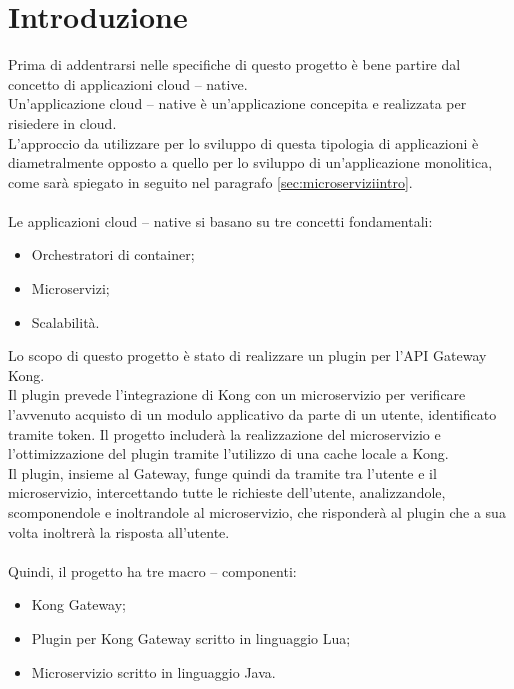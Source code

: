 \chapter*{Introduzione} %

Prima di addentrarsi nelle specifiche di questo progetto è bene partire dal concetto di applicazioni cloud – native.\\
Un'applicazione cloud – native è un'applicazione concepita e realizzata per risiedere in cloud.\\
L'approccio da utilizzare per lo sviluppo di questa tipologia di applicazioni è diametralmente opposto a quello per lo sviluppo di un'applicazione monolitica, 
come sarà spiegato in seguito nel paragrafo \ref{sec:microserviziintro}.\\ \\
Le applicazioni cloud – native si basano su tre concetti fondamentali:
\begin{itemize}
\item Orchestratori di container;
\item Microservizi;
\item Scalabilità.
\end{itemize}

Lo scopo di questo progetto è stato di realizzare un plugin per l'API Gateway Kong.\\
Il plugin prevede l'integrazione di Kong con un microservizio per verificare l'avvenuto acquisto di un modulo applicativo da parte di un utente, identificato tramite token.
Il progetto includerà la realizzazione del microservizio e l'ottimizzazione del plugin tramite l'utilizzo di una cache locale a Kong.\\
Il plugin, insieme al Gateway, funge quindi da tramite tra l'utente e il microservizio, intercettando tutte le richieste dell'utente, analizzandole, scomponendole e 
inoltrandole al microservizio, che risponderà al plugin che a sua volta inoltrerà la risposta all'utente.\\ \\
Quindi, il progetto ha tre macro – componenti:
\begin{itemize}
\item Kong Gateway;
\item Plugin per Kong Gateway scritto in linguaggio Lua;
\item Microservizio scritto in linguaggio Java.
\end{itemize}

